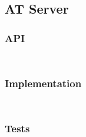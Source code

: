 \subsection{AT Server}

\subsubsection{API}

\inputminted[frame=lines, label=at\_server.erl]{erlang}{../src/at_server/at_server.erl}

\inputminted[frame=lines, label=at\_extapi.erl]{erlang}{../src/at_server/at_extapi.erl}


\subsubsection{Implementation}

\inputminted[frame=lines, label=at\_server\_master.erl]{erlang}{../src/at_server/at_server_master.erl}

\inputminted[frame=lines, label=at\_server\_helper.erl]{erlang}{../src/at_server/at_server_helper.erl}


\subsubsection{Tests}

\inputminted[frame=lines, label=at\_server\_tests.erl]{erlang}{../src/at_server/at_server_tests.erl}
